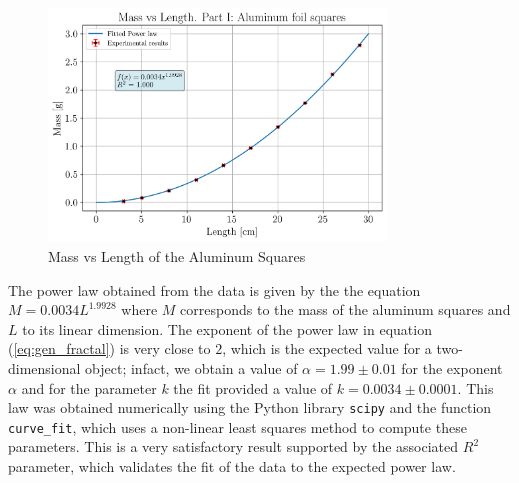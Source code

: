 \documentclass[a4paper,12pt]{article}
\begin{document}
\begin{figure}[h!] 
    \centering
    \includegraphics[width = 0.8\textwidth]{mass_vs_length.png}
    \caption{Mass vs Length of the Aluminum Squares}
    \label{fig:mass_vs_length}
\end{figure}

The power law obtained from the data is given by the the equation $M = 0.0034 L^{1.9928}$ where $M$ corresponds 
to the mass of the aluminum squares and $L$ to its linear dimension. The exponent of the power law in equation (\ref{eq:gen_fractal}) is very close 
to $2$, which is the expected value for a two-dimensional object; infact, we obtain a value of $\alpha = 1.99 \pm 0.01$ for the 
exponent $\alpha$ and for the parameter $k$ the fit provided a value of $k = 0.0034 \pm 0.0001$. This law was obtained numerically 
using the Python library \texttt{scipy} and the function \texttt{curve\_fit}, which uses a non-linear least squares method to compute these parameters. 
This is a very satisfactory result supported by the associated $R^2$ parameter, which validates the fit of the 
data to the expected power law.  
\end{document}
